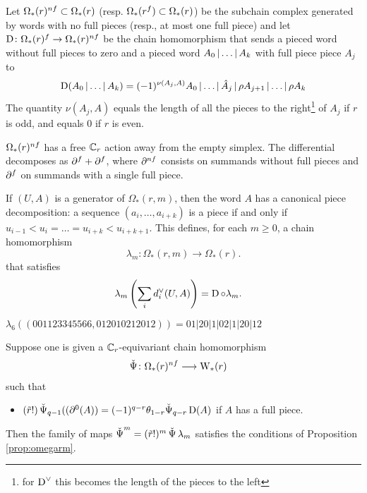 Let $\Omega_*(r)^{nf}\subset \Omega_*(r)$ (resp. $\Omega_*(r^{f})\subset \Omega_*(r)$) be the subchain complex generated by words with no full pieces (resp., at most one full piece) and let $\operatorname{D}\colon \Omega_*(r)^{f}\to \Omega_*(r)^{nf}$ be the chain homomorphism that sends a pieced word  without full pieces to zero and a pieced word $A_0\operatorname{|}\ldots\operatorname{|} A_k$ with full piece piece $A_j$ to
\[
\operatorname{D}(A_0\operatorname{|} \ldots\operatorname{|} A_k) = (-1)^{\nu(A_{j},A)}A_0\operatorname{|} \ldots\operatorname{|} \hat{A}_{j}\operatorname{|} \rho A_{j+1}\operatorname{|} \ldots\operatorname{|} \rho A_k
\]
The quantity $\nu(A_j,A)$ equals the length of all the pieces to the right\footnote{for $\operatorname{D}^\vee$ this becomes the length of the pieces to the left} of $A_j$ if $r$ is odd, and equals $0$ if $r$ is even.

$\Omega_*(r)^{nf}$ has a free $\mathbb{C}_r$ action away from the empty simplex. The differential decomposes as $\partial^{f}+\partial^{f}$, where $\partial^{nf}$ consists on summands without full pieces and $\partial^{f}$ on summands with a single full piece.

If $(U,A)$ is a generator of $\Omega_*(r,m)$, then the word $A$ has a canonical piece decomposition: a sequence $(a_i,\ldots,a_{i+k})$ is a piece if and only if $u_{i-1}<u_i =\ldots= u_{i+k}<u_{i+k+1}$. This defines, for each $m\geq 0$, a chain homomorphism
\[\lambda_m\colon \Omega_*(r,m)\to \Omega_*(r).\]
that satisfies
\begin{align*}
	\lambda_m\left(\sum_i d_i^\vee(U,A)\right) &= \operatorname{D}\circ \lambda_m.
\end{align*}
%
\begin{example}\label{ex:106}
	$\lambda_6((001123345566,012010212012)) = 01|20|1|02|1|20|12$
\end{example}



\begin{lemma} \label{lemma:omegar}
	Suppose one is given a $\mathbb{C}_r$-equivariant chain homomorphism
	\begin{align*}
		\operatorname{\check{\Psi}}\colon \Omega_*(r)^{nf}&\longrightarrow \mathrm{W}_*(r)
	\end{align*}
	such that
	\begin{itemize}
		\item $(\tilde{r}!)\operatorname{\check{\Psi}}_{q-1}((\partial^0 (A)) = (-1)^{q-r}\theta_{1-r}\check{\Psi}_{q-r}\operatorname{D}(A)$ if $A$ has a full piece.
	\end{itemize}
	Then the family of maps $\operatorname{\check{\Psi}}^m = (\tilde{r}!)^{m}\operatorname{\check{\Psi}}\lambda_m$ satisfies the conditions of Proposition \ref{prop:omegarm}.
\end{lemma}

